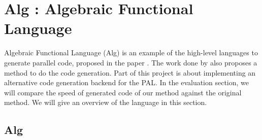 \chapter{Alg : Algebraic Functional Language}
Algebraic Functional Language (Alg) is an example of the high-level languages to generate parallel code, proposed in the paper \cite{AlgebraicMultipartyProtocol}. The work done by \cite{AlgebraicMultipartyProtocol} also proposes a method to do the code generation. Part of this project is about implementing an alternative code generation backend for the PAL. In the evaluation section, we will compare the speed of generated code of our method against the original method. We will give an overview of the language in this section.  
\section{Alg}
